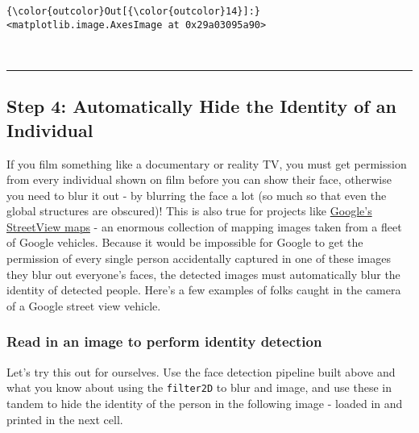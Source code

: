 \documentclass[11pt]{article}
\begin{document}
\begin{Verbatim}[commandchars=\\\{\}]
{\color{outcolor}Out[{\color{outcolor}14}]:} <matplotlib.image.AxesImage at 0x29a03095a90>
\end{Verbatim}
            
    \begin{center}
    \end{center}
    { \hspace*{\fill} \\}
    
    \begin{center}\rule{0.5\linewidth}{\linethickness}\end{center}

\subsection{Step 4: Automatically Hide the Identity of an
Individual}\label{step-4-automatically-hide-the-identity-of-an-individual}

If you film something like a documentary or reality TV, you must get
permission from every individual shown on film before you can show their
face, otherwise you need to blur it out - by blurring the face a lot (so
much so that even the global structures are obscured)! This is also true
for projects like \href{https://www.google.com/streetview/}{Google's
StreetView maps} - an enormous collection of mapping images taken from a
fleet of Google vehicles. Because it would be impossible for Google to
get the permission of every single person accidentally captured in one
of these images they blur out everyone's faces, the detected images must
automatically blur the identity of detected people. Here's a few
examples of folks caught in the camera of a Google street view vehicle.

 

    \subsubsection{Read in an image to perform identity
detection}\label{read-in-an-image-to-perform-identity-detection}

Let's try this out for ourselves. Use the face detection pipeline built
above and what you know about using the \texttt{filter2D} to blur and
image, and use these in tandem to hide the identity of the person in the
following image - loaded in and printed in the next cell.
\end{document}
